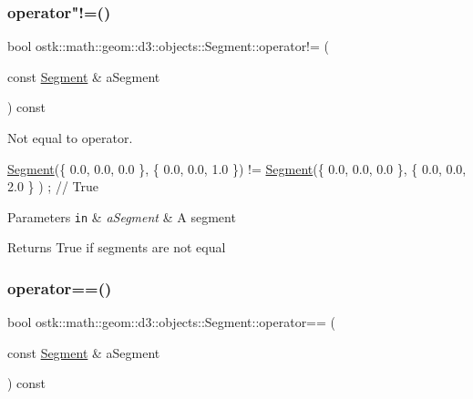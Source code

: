 \subsubsection{\texorpdfstring{operator"!=()}{operator!=()}}
{\footnotesize\ttfamily bool ostk\+::math\+::geom\+::d3\+::objects\+::\+Segment\+::operator!= (\begin{DoxyParamCaption}\item[{const \hyperlink{classostk_1_1math_1_1geom_1_1d3_1_1objects_1_1_segment}{Segment} \&}]{a\+Segment }\end{DoxyParamCaption}) const}



Not equal to operator. 


\begin{DoxyCode}
\hyperlink{classostk_1_1math_1_1geom_1_1d3_1_1objects_1_1_segment_aa2cb60ce06335a5f76120c658219494c}{Segment}(\{ 0.0, 0.0, 0.0 \}, \{ 0.0, 0.0, 1.0 \}) != \hyperlink{classostk_1_1math_1_1geom_1_1d3_1_1objects_1_1_segment_aa2cb60ce06335a5f76120c658219494c}{Segment}(\{ 0.0, 0.0, 0.0 \}, \{ 0.0, 0.0, 2.0 \}
      ) ; \textcolor{comment}{// True}
\end{DoxyCode}



\begin{DoxyParams}[1]{Parameters}
\mbox{\tt in}  & {\em a\+Segment} & A segment \\
\hline
\end{DoxyParams}
\begin{DoxyReturn}{Returns}
True if segments are not equal 
\end{DoxyReturn}
\mbox{\label{classostk_1_1math_1_1geom_1_1d3_1_1objects_1_1_segment_ae19c34b4b4cf1ff5bb1be0835c7c064e}} 
\subsubsection{\texorpdfstring{operator==()}{operator==()}}
{\footnotesize\ttfamily bool ostk\+::math\+::geom\+::d3\+::objects\+::\+Segment\+::operator== (\begin{DoxyParamCaption}\item[{const \hyperlink{classostk_1_1math_1_1geom_1_1d3_1_1objects_1_1_segment}{Segment} \&}]{a\+Segment }\end{DoxyParamCaption}) const}



